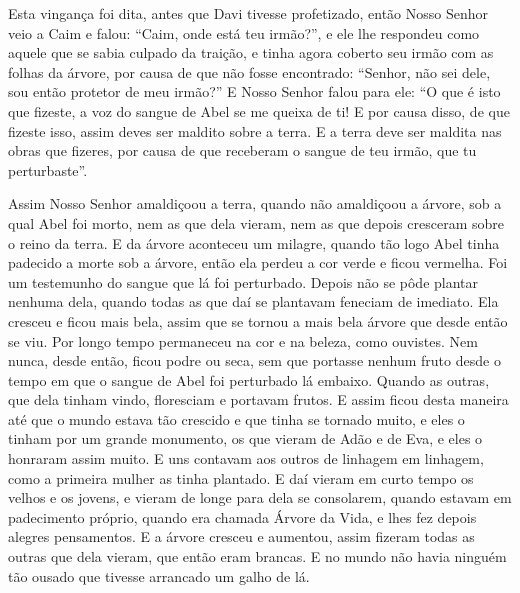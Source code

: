  Esta vingança foi dita, antes que Davi tivesse profetizado, então Nosso Senhor
veio a Caim e falou: “Caim, onde está teu irmão?”, e ele lhe respondeu como
aquele que se sabia culpado da traição, e tinha agora coberto seu irmão com as
folhas da árvore, por causa de que não fosse encontrado: “Senhor, não sei dele,
sou então protetor de meu irmão?” E Nosso Senhor falou para ele: “O que é isto
que fizeste, a voz do sangue de Abel se me queixa de ti! E por causa disso, de
que fizeste isso, assim deves ser maldito sobre a terra. E a terra deve ser
maldita nas obras que fizeres, por causa de que receberam o sangue de teu
irmão, que tu perturbaste”.

Assim Nosso Senhor amaldiçoou a terra, quando não amaldiçoou a árvore, sob a
qual Abel foi morto, nem as que dela vieram, nem as que depois cresceram sobre
o reino da terra. E da árvore aconteceu um milagre, quando tão logo Abel tinha
padecido a morte sob a árvore, então ela perdeu a cor verde e ficou vermelha.
Foi um testemunho do sangue que lá foi perturbado. Depois não se pôde plantar
nenhuma dela, quando todas as que daí se plantavam feneciam de imediato. Ela
cresceu e ficou mais bela, assim que se tornou a mais bela árvore que desde
então se viu. Por longo tempo permaneceu na cor e na beleza, como ouvistes. Nem
nunca, desde então, ficou podre ou seca, sem que portasse nenhum fruto desde o
tempo em que o sangue de Abel foi perturbado lá embaixo. Quando as outras, que
dela tinham vindo, floresciam e portavam frutos. E assim ficou desta maneira
até que o mundo estava tão crescido e que tinha se tornado muito, e eles o
tinham por um grande monumento, os que vieram de Adão e de Eva, e eles o
honraram assim muito. E uns contavam aos outros de linhagem em linhagem, como a
primeira mulher as tinha plantado. E daí vieram em curto tempo os velhos e os
jovens, e vieram de longe para dela se consolarem, quando estavam em
padecimento próprio, quando era chamada Árvore da Vida, e lhes fez depois
alegres pensamentos. E a árvore cresceu e aumentou, assim fizeram todas as
outras que dela vieram, que então eram brancas. E no mundo não havia ninguém
tão ousado que tivesse arrancado um galho de lá. 

